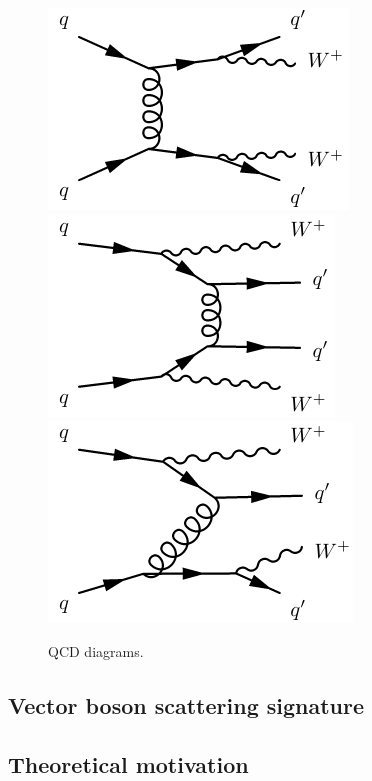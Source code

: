 \begin{figure}[htbp]
  \centering
    \includegraphics[width=.32\textwidth]{figs/ssww_13tev/diagrams/qcd1}
    \includegraphics[width=.32\textwidth]{figs/ssww_13tev/diagrams/qcd2}
    \includegraphics[width=.32\textwidth]{figs/ssww_13tev/diagrams/qcd3}
  \caption{QCD diagrams. }
  \label{fig:ssww13tev_diagrams_qcd}
\end{figure}

\subsection{Vector boson scattering signature}\label{ssww13tev:vbs_signature}


\subsection{Theoretical motivation}\label{ssww13tev:theory}

